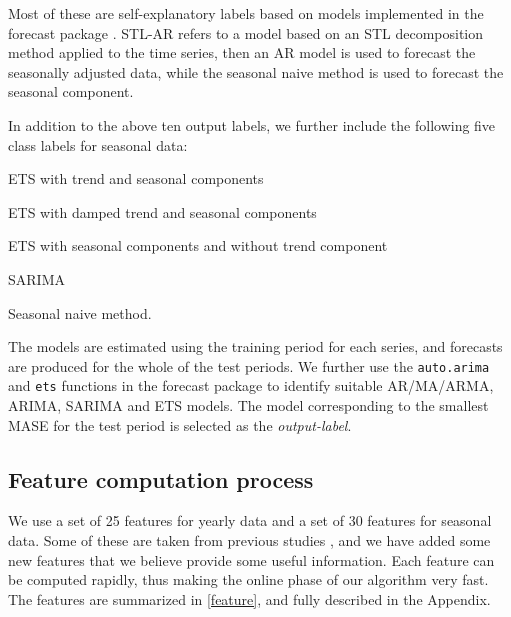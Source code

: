 \documentclass[11pt,a4paper,]{article}
\theoremstyle{definition}
\theoremstyle{definition}
\theoremstyle{definition}
\theoremstyle{remark}
\begin{document}
Most of these are self-explanatory labels based on models implemented in
the forecast package \autocite{Hyndman2008}. STL-AR refers to a model
based on an STL decomposition method applied to the time series, then an
AR model is used to forecast the seasonally adjusted data, while the
seasonal naive method is used to forecast the seasonal component.

In addition to the above ten output labels, we further include the
following five class labels for seasonal data:

\begin{compactenum}[\hspace*{1cm}(a)]\setcounter{enumi}{10}
  \item ETS with trend and seasonal components
  \item ETS with damped trend and seasonal components
  \item ETS with seasonal components and without trend component
  \item SARIMA
  \item Seasonal naive method.
  \end{compactenum}

The models are estimated using the training period for each series, and
forecasts are produced for the whole of the test periods. We further use
the \texttt{auto.arima} and \texttt{ets} functions in the forecast
package to identify suitable AR/MA/ARMA, ARIMA, SARIMA and ETS models.
The model corresponding to the smallest MASE
\autocite{hyndman2006another} for the test period is selected as the
\emph{output-label}.

\subsection{Feature computation process}\label{sec:features}

We use a set of 25 features for yearly data and a set of 30 features for
seasonal data. Some of these are taken from previous studies
\autocites{wang2009rule}{hyndman2015large}{kang2017visualising}, and we
have added some new features that we believe provide some useful
information. Each feature can be computed rapidly, thus making the
online phase of our algorithm very fast. The features are summarized in
\autoref{feature}, and fully described in the Appendix.
\end{document}
